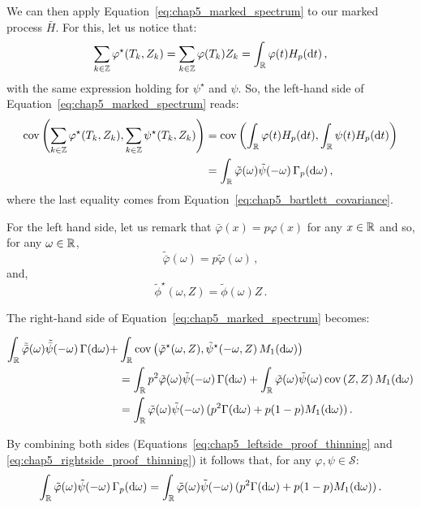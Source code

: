 \begin{subappendices}
        We can then apply Equation~\eqref{eq:chap5_marked_spectrum} to our marked process $\bar H$. 
        For this, let us notice that:
        \[
            \sum_{k\in{\mathbb Z}}{\varphi^\star(T_k, Z_k)} = \sum_{k\in{\mathbb Z}}{\varphi(T_k)Z_k} = \int_{{\mathbb R}}{\varphi(t) H_p({\mathrm{d}} t)}\,,
        \]
        with the same expression holding for $\psi^\star$ and $\psi$. 
        So, the left-hand side of Equation~\eqref{eq:chap5_marked_spectrum} reads:
        \begin{align}
            \operatorname{cov}\left(\sum_{k\in{\mathbb Z}}{\varphi^\star(T_k, Z_k)}, \sum_{k\in{\mathbb Z}}{\psi^\star(T_k, Z_k)}\right) &=
            \operatorname{cov}\left(\int_{{\mathbb R}}{\varphi(t) H_p({\mathrm{d}} t)}, \int_{{\mathbb R}}{\psi(t) H_p({\mathrm{d}} t)}\right) \nonumber\\
            &= \int_{{\mathbb R}}{\tilde \varphi(\omega)\tilde \psi(-\omega)\,\Gamma_p({\mathrm{d}}\omega)}\,,\label{eq:chap5_leftside_proof_thinning}
        \end{align}
        where the last equality comes from Equation~\eqref{eq:chap5_bartlett_covariance}.

        For the left hand side, let us remark that $\bar \varphi(x) = p \varphi(x)$ for any $x\in{\mathbb R}$ and so, for any $\omega\in{\mathbb R}$,
        \[
            \tilde \bar \varphi(\omega) = p \tilde \varphi(\omega)\,,
        \]
        and,
        \[\tilde \phi^\star(\omega, Z) = \tilde \phi(\omega)Z\,.\]

        The right-hand side of Equation~\eqref{eq:chap5_marked_spectrum} becomes:

        \begin{align}
            \int_{{\mathbb R}}{\tilde {\bar\varphi} (\omega) \tilde{\bar \psi} (-\omega)\,\Gamma({\mathrm{d}} \omega)} 
        + &\int_{{\mathbb R}}{\operatorname{cov}\left( \tilde \varphi^\star(\omega, Z), \tilde \psi^\star (-\omega, Z)\,M_1({\mathrm{d}} \omega)\right)} \nonumber\\
        &= \int_{{\mathbb R}}{p^2 \tilde {\varphi} (\omega) \tilde{\psi} (-\omega)\,\Gamma({\mathrm{d}} \omega)} 
        + \int_{{\mathbb R}}{\tilde \varphi(\omega)\tilde \psi(\omega) \operatorname{cov}\left(Z,Z\right)M_1({\mathrm{d}} \omega)} \nonumber\\
        &= \int_{{\mathbb R}}{\tilde {\varphi} (\omega) \tilde{\psi} (-\omega)\,(p^2\Gamma({\mathrm{d}} \omega) + p(1-p) M_1({\mathrm{d}} \omega))}\,.\label{eq:chap5_rightside_proof_thinning}
        \end{align}

        By combining both sides (Equations~\eqref{eq:chap5_leftside_proof_thinning} and \eqref{eq:chap5_rightside_proof_thinning}) it follows that,
        for any $\varphi, \psi\in\mathcal{S}$:
        \[
            \int_{{\mathbb R}}{\tilde \varphi(\omega)\tilde \psi(-\omega)\,\Gamma_p({\mathrm{d}}\omega)} = \int_{{\mathbb R}}{\tilde {\varphi} (\omega) \tilde{\psi} (-\omega)\,(p^2\Gamma({\mathrm{d}} \omega) + p(1-p) M_1({\mathrm{d}} \omega))}\,.
        \]
        

\end{subappendices}
